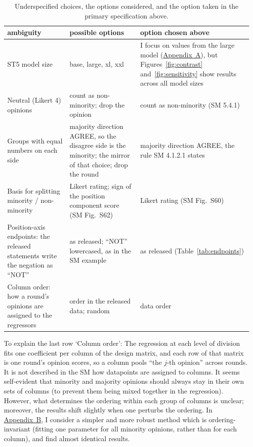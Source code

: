 \documentclass[11pt,a4paper]{article}
\begin{document}
\begin{table}[H]
\centering
\small
\caption{Underspecified choices, the options considered, and the option taken in the
primary specification above.}
\label{tab:ambiguity}
\begin{tabular}{p{4.1cm}p{6.2cm}p{4.4cm}}
\toprule
ambiguity & possible options & option chosen above \\
\midrule
ST5 model size & base, large, xl, xxl & I focus on values from the large model (\hyperref[app:rsq]{Appendix~A}), but Figures~\ref{fig:contrast} and~\ref{fig:sensitivity} show results across all model sizes \\
Neutral (Likert 4) opinions & count as non-minority; drop the opinion & count as non-minority (SM 5.4.1) \\
Groups with equal numbers on each side & majority direction AGREE, so the disagree side is the minority; the mirror of that choice; drop the round & majority direction AGREE, the rule SM 4.1.2.1 states \\
Basis for splitting minority / non-minority & Likert rating; sign of the position component score (SM Fig.\ S62) & Likert rating (SM Fig.\ S60) \\
Position-axis endpoints: the released statements write the negation as ``NOT'' & as released; ``NOT'' lowercased, as in the SM example & as released (Table~\ref{tab:endpoints}) \\
Column order: how a round's opinions are assigned to the regressors & order in the released data; random & data order \\
\bottomrule
\end{tabular}
\end{table}

To explain the last row `Column order': The regression at each level of division fits one
coefficient per column of the design matrix, and each row of that matrix is one round's opinion
scores, so a column pools ``the $j$-th opinion'' across rounds. It is not described in the SM how datapoints are assigned to columns. 
It seems self-evident that minority and majority opinions should always stay in their own sets of columns (to prevent them being mixed together in the regression).
However, what determines the ordering within each group of columns is unclear; moreover, the results shift slightly when one perturbs the ordering. 
In \hyperref[app:blocks]{Appendix~B}, I consider a simpler and more robust method which is ordering-invariant (fitting one parameter for all minority opinions, rather than
for each column), and find almost identical results.
\end{document}
